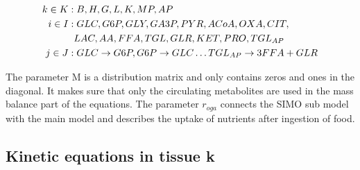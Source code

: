 \documentclass{IEEEtran}
\begin{document}
\begin{align*}
k \in K: &\hspace{1mm} B,H,G,L,K,MP,AP \\
i \in I: &\hspace{1mm} GLC,G6P,GLY,GA3P,PYR,ACoA,OXA,CIT, \\
        & LAC,AA,FFA,TGL,GLR,KET,PRO,TGL_{AP}     \\
j \in J: &\hspace{1mm}
GLC\rightarrow G6P, G6P\rightarrow GLC \ldots TGL_{AP} \rightarrow 3FFA + GLR 
\end{align*}


The parameter M is a distribution matrix and only contains zeros and ones in the diagonal. It makes sure that only the circulating metabolites are used in the mass balance part of the equations. The parameter $r_{oga}$ connects the SIMO sub model with the main model and describes the uptake of nutrients after ingestion of food. 


\onecolumn
\subsection{Kinetic equations in tissue k}

    


\end{document}

